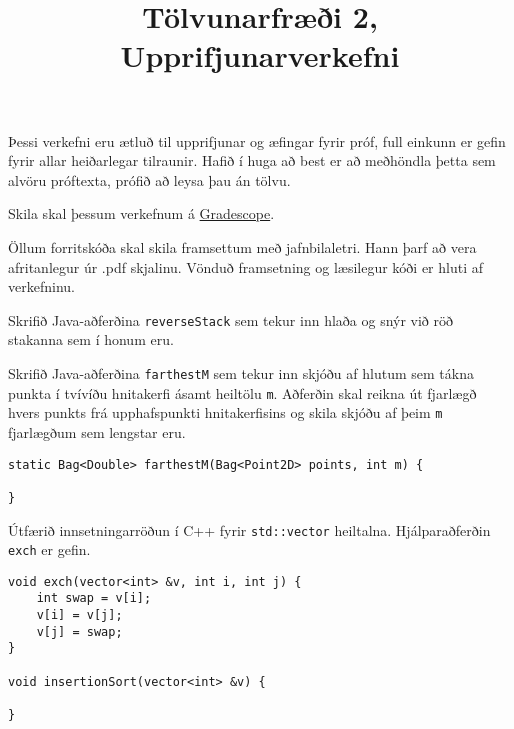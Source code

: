 \documentclass{article}
\title{Tölvunarfræði 2, \semester \\ Upprifjunarverkefni}
\author{}
\begin{document}
\maketitle
{}

Þessi verkefni eru ætluð til upprifjunar og æfingar fyrir próf, full einkunn er gefin fyrir allar heiðarlegar tilraunir. Hafið í huga að best er að meðhöndla þetta sem alvöru próftexta, prófið að leysa þau án tölvu.

Skila skal þessum verkefnum á \href{https://gradescope.com/courses/14122}{Gradescope}.

Öllum forritskóða skal skila framsettum með jafnbilaletri. Hann þarf að vera afritanlegur úr .pdf skjalinu. Vönduð framsetning og læsilegur kóði er hluti af verkefninu. 

\question
Skrifið Java-aðferðina \texttt{reverseStack} sem tekur inn hlaða og snýr við röð stakanna sem í honum eru.

\question
Skrifið Java-aðferðina \texttt{farthestM} sem tekur inn skjóðu af hlutum sem tákna punkta í tvívíðu hnitakerfi ásamt heiltölu \texttt{m}. Aðferðin skal reikna út fjarlægð hvers punkts frá upphafspunkti hnitakerfisins og skila skjóðu af þeim \texttt{m} fjarlægðum sem lengstar eru.

\begin{verbatim}
static Bag<Double> farthestM(Bag<Point2D> points, int m) {

}
\end{verbatim}

\question

Útfærið innsetningarröðun í C++ fyrir \texttt{std::vector} heiltalna. Hjálparaðferðin \texttt{exch} er gefin.

\begin{verbatim}
void exch(vector<int> &v, int i, int j) {
    int swap = v[i];
    v[i] = v[j];
    v[j] = swap;
}

void insertionSort(vector<int> &v) {

}
\end{verbatim}
\end{document}
